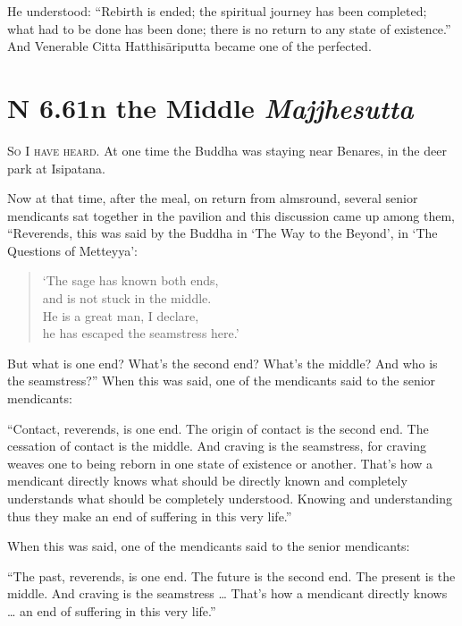 \documentclass[12pt,openany]{book}%
\newcommand*{\suttatitleacronym}[1]{\smaller[2]{#1}\vspace*{.3em}}
\newcommand*{\suttatitletranslation}[1]{\linebreak{#1}}
\newcommand*{\suttatitleroot}[1]{\linebreak\smaller[2]\itshape{#1}}
\newcommand*{\tocacronym}[1]{\hspace*{-3.3em}{#1}\quad}
\newcommand*{\toctranslation}[1]{#1}
\newcommand*{\tocroot}[1]{(\textit{#1})}
\newcommand*{\scevam}[1]{\textsc{#1}}
\begin{document}
He understood: “Rebirth is ended; the spiritual journey has been completed; what had to be done has been done; there is no return to any state of existence.” And Venerable Citta \textsanskrit{Hatthisāriputta} became one of the perfected. 

%
\section*{{\suttatitleacronym AN 6.61}{\suttatitletranslation In the Middle }{\suttatitleroot Majjhesutta}}
\addcontentsline{toc}{section}{\tocacronym{AN 6.61} \toctranslation{In the Middle } \tocroot{Majjhesutta}}

\scevam{So I have heard. }At one time the Buddha was staying near Benares, in the deer park at Isipatana. 

Now at that time, after the meal, on return from almsround, several senior mendicants sat together in the pavilion and this discussion came up among them, “Reverends, this was said by the Buddha in ‘The Way to the Beyond’, in ‘The Questions of Metteyya’: 

\begin{verse}%
‘The sage has known both ends, \\
and is not stuck in the middle. \\
He is a great man, I declare, \\
he has escaped the seamstress here.’ 

%
\end{verse}

But what is one end? What’s the second end? What’s the middle? And who is the seamstress?” When this was said, one of the mendicants said to the senior mendicants: 

“Contact, reverends, is one end. The origin of contact is the second end. The cessation of contact is the middle. And craving is the seamstress, for craving weaves one to being reborn in one state of existence or another. That’s how a mendicant directly knows what should be directly known and completely understands what should be completely understood. Knowing and understanding thus they make an end of suffering in this very life.” 

When this was said, one of the mendicants said to the senior mendicants: 

“The past, reverends, is one end. The future is the second end. The present is the middle. And craving is the seamstress … That’s how a mendicant directly knows … an end of suffering in this very life.” 
\end{document}
